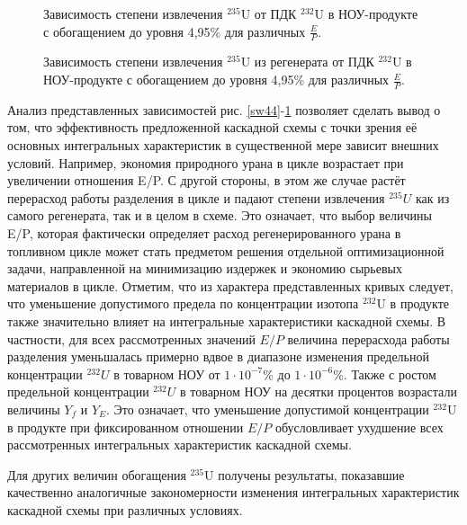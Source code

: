 {\begin{figure}[ht]
    \centering
    \begin{minipage}{.5\textwidth}
      \centering
      
      \caption{{Зависимость степени извлечения $^{235}$U от ПДК $^{232}$U в НОУ-продукте с обогащением до уровня 4,95\% для различных $\frac{E}{P}$.{\label{ex495}}}}
    \end{minipage}%
    \begin{minipage}{.5\textwidth}
      \centering
      
      \caption{{Зависимость степени извлечения $^{235}$U из регенерата от ПДК $^{232}$U в НОУ-продукте с обогащением до уровня 4,95\% для различных $\frac{E}{P}$.{\label{exR495}}}}
\end{minipage}
\end{figure}


Анализ представленных зависимостей рис. \ref{sw44}-\ref{exR495} позволяет сделать вывод о том, что эффективность предложенной каскадной схемы с точки зрения её основных интегральных характеристик в существенной мере зависит внешних условий. Например, экономия природного урана в цикле возрастает при увеличении отношения E/P. С другой стороны, в этом же случае растёт перерасход работы разделения в цикле и падают степени извлечения $^{235}U$ как из самого регенерата, так и в целом в схеме. Это означает, что выбор величины E/P, которая фактически определяет расход регенерированного урана в топливном цикле может стать предметом решения отдельной оптимизационной задачи, направленной на минимизацию издержек и экономию сырьевых материалов в цикле. 
Отметим, что из характера представленных кривых следует, что уменьшение допустимого предела по концентрации изотопа $^{232}$U в продукте также значительно влияет на интегральные характеристики каскадной схемы. В частности, для всех рассмотренных значений $E/P$ величина перерасхода работы разделения уменьшалась примерно вдвое в диапазоне изменения предельной концентрации $^{232}U$ в товарном НОУ от $1\cdot10^{-7}$\% до $1\cdot10^{-6}$\%. Также с ростом предельной концентрации $^{232}U$ в товарном НОУ на десятки процентов возрастали величины $Y_f$ и $Y_{E}$. Это означает, что уменьшение допустимой концентрации $^{232}$U в продукте при фиксированном отношении $E/P$ обусловливает ухудшение всех рассмотренных интегральных характеристик каскадной схемы. 

Для других величин обогащения $^{235}$U получены результаты, показавшие качественно аналогичные закономерности изменения интегральных характеристик каскадной схемы при различных условиях. 

}
